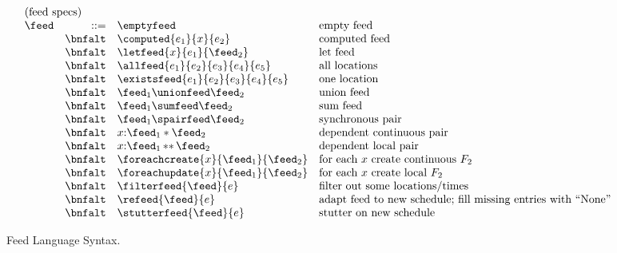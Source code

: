 \begin{figure*}[t]
\[
\begin{array}{lrll}
\multicolumn{4}{l}{\mbox{(feed specs)}}\\ 
\feed & ::=     
& \emptyfeed & \mbox{empty feed} \\
 & \bnfalt & \computed{e_1}{x}{e_2} & \mbox{computed feed} \\
 & \bnfalt & \letfeed{x}{e_1}{\feed_2} & \mbox{let feed} \\
 & \bnfalt & \allfeed{e_1}{e_2}{e_3}{e_4}{e_5} & \mbox{all locations} \\
 & \bnfalt & \existsfeed{e_1}{e_2}{e_3}{e_4}{e_5} & \mbox{one location} \\
 & \bnfalt & \feed_1 \unionfeed \feed_2 & \mbox{union feed} \\
 & \bnfalt & \feed_1 \sumfeed \feed_2 & \mbox{sum feed} \\
 & \bnfalt & \feed_1 \spairfeed \feed_2 & \mbox{synchronous pair} \\
 & \bnfalt & x{:}\feed_1 * \feed_2 & \mbox{dependent continuous pair} \\
 & \bnfalt & x{:}\feed_1\, {*}{*} \, \feed_2 & \mbox{dependent local pair} \\
 & \bnfalt & \foreachcreate{x}{\feed_1}{\feed_2} & \mbox{for each $x$ create continuous $F_2$} \\
 & \bnfalt & \foreachupdate{x}{\feed_1}{\feed_2} & \mbox{for each $x$ create local $F_2$} \\
 & \bnfalt & \filterfeed{\feed}{e} & \mbox{filter out some locations/times} \\
 & \bnfalt & \refeed{\feed}{e} & \mbox{adapt feed to new schedule; 
                                               fill missing entries with ``None''} \\
 & \bnfalt & \stutterfeed{\feed}{e} & \mbox{stutter on new schedule} \\

\end{array}
\]
\caption{Feed Language Syntax.}
\label{fig:syntax}
\end{figure*}


